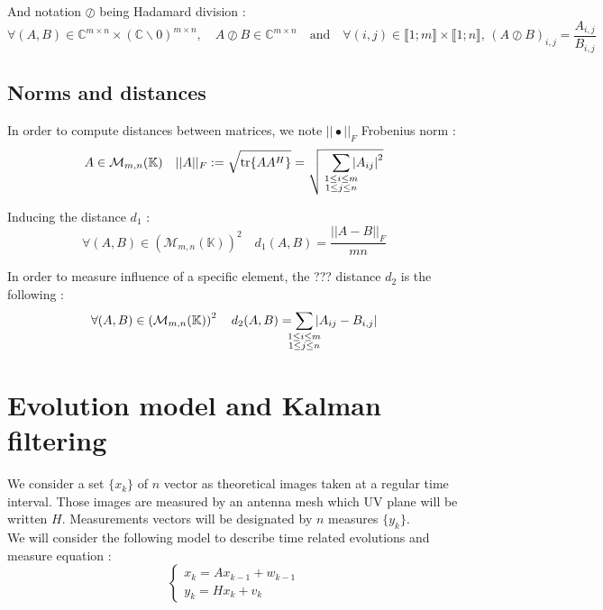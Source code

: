 \documentclass[titlepage]{article}
\newcommand{\fnorm}[1]{|\vert#1|\vert_{F}} %
\begin{document}
	And notation $\oslash$ being Hadamard division :
	$$
	\forall (A,B)\in\mathbb{C}^{m\times n}\times\left(\mathbb{C}\backslash0\right)^{m\times n}, \quad A\oslash B\in\mathbb{C}^{m\times n} \quad\text{and}\quad \forall (i,j)\in\llbracket1;m\rrbracket\times\llbracket1;n\rrbracket,\, (A\oslash B)_{i,j} = \frac{A_{i,j}}{B_{i,j}}
	$$
	
	\subsection{Norms and distances}
	
	In order to compute distances between matrices, we note $\fnorm{\bullet}$ Frobenius norm :
	$$
	A\in\mathcal{M}_{m,n}(\mathbb{K}) \quad \fnorm{A} := \sqrt{\tr{AA^H}} = \sqrt{
		\;\;\;\sum_{
			\mathclap{
				\substack{
					1\le i\le m \\1\le j\le n
				}
			}
		}\abs{A_{ij}}^2}
	$$
	
	Inducing the distance $d_1$ :
	$$
	\forall(A,B)\in\left(\mathcal{M}_{m,n}(\mathbb{K})\right)^2\quad d_1(A,B) = \frac{\fnorm{A-B}}{mn}
	$$
	
	In order to measure influence of a specific element, the ??? distance $d_2$ is the following :
	$$
	\forall(A,B)\in\left(\mathcal{M}_{m,n}(\mathbb{K})\right)^2\quad d_2(A,B) = \sum_{
		\mathclap{
			\substack{
				1\le i\le m \\1\le j\le n
			}
		}
	}\abs{A_{ij} - B_{i,j}}
	$$
	
	
	\section{Evolution model and Kalman filtering}
	
	We consider a set $\{x_k\}$ of $n$ vector as theoretical images taken at a regular time interval. Those images are measured by an antenna mesh which UV plane will be written $H$. Measurements vectors will be designated by $n$ measures $\{y_k\}$.\\
	We will consider the following model to describe time related evolutions and measure equation :
	$$
		\begin{cases}
			x_k = Ax_{k-1} + w_{k-1}\\
			y_k = Hx_k + v_k
		\end{cases}
	$$
	
\end{document}
